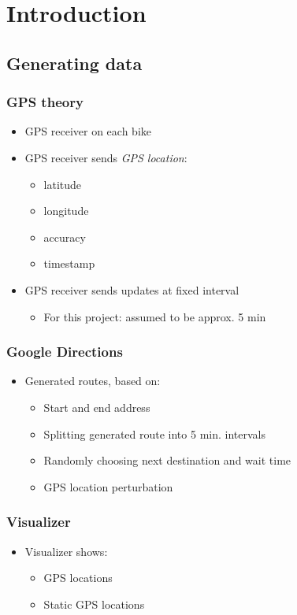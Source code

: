 \section{Introduction}

\subsection{Generating data}

\begin{frame}
\frametitle{GPS theory}

\begin{itemize}
\item GPS receiver on each bike
\item GPS receiver sends \textit{GPS location}:
  \begin{itemize}
  \item latitude
  \item longitude
  \item accuracy
  \item timestamp
  \end{itemize}
\item GPS receiver sends updates at fixed interval
  \begin{itemize}
  \item For this project: assumed to be approx. 5 min
  \end{itemize}
\end{itemize}

\end{frame}

\begin{frame}
\frametitle{Google Directions}

\begin{itemize}
\item Generated routes, based on:
  \begin{itemize}
  \item Start and end address
  \item Splitting generated route into 5 min. intervals
  \item Randomly choosing next destination and wait time
  \item GPS location perturbation
  \end{itemize}
\end{itemize}

\end{frame}

\begin{frame}
\frametitle{Visualizer}

\begin{itemize}
\item Visualizer shows:
  \begin{itemize}
  \item GPS locations
  \item Static GPS locations
  \end{itemize}
\end{itemize}

\end{frame}

